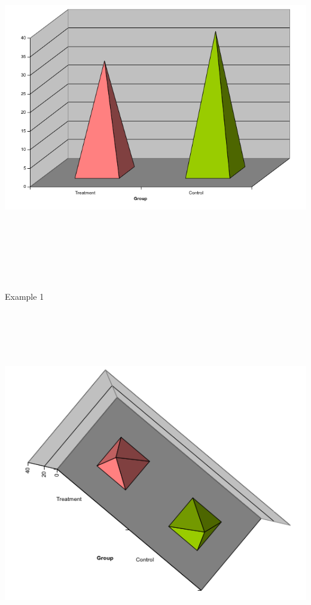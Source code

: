 \documentclass[12pt]{article}
\newcommand{\headsize}{\fontsize{35}{35} \selectfont}
\begin{document}
\centerline{\includegraphics[height=6in]{Figs/fig1g.png}}


\newpage


\headsize \color{myyellow}
\hfill \begin{minipage}{5.75in}
\centering
Example 1
\end{minipage}

\vspace{30mm}

\centerline{\includegraphics[height=6in]{Figs/fig1h.png}}
\end{document}
